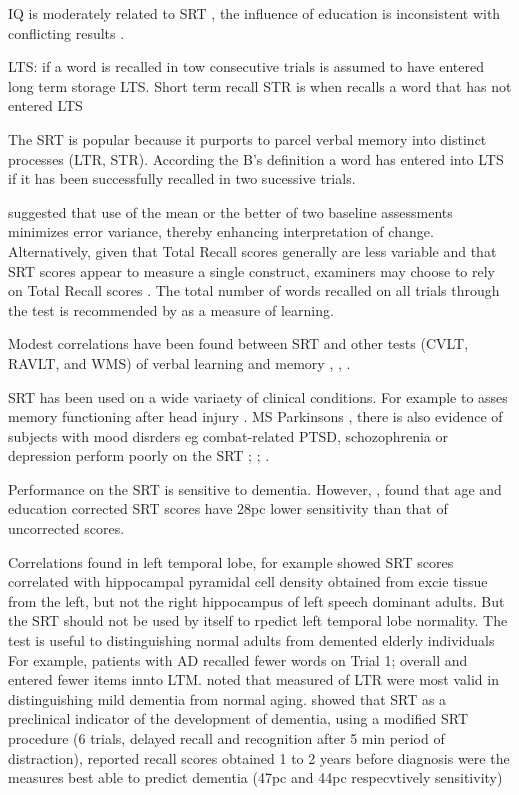 \documentclass[11pt]{article}
\begin{document}
IQ is moderately related to SRT \cite{sherman1995construct}, the influence of education is inconsistent with conflicting results \cite{campo2004normative}.

LTS: if a word is recalled in tow consecutive trials is assumed to have entered long term storage LTS. Short term recall STR is when recalls a word that has not entered LTS 

The SRT is popular because it purports to parcel verbal memory into distinct processes (LTR, STR). According the B's definition a word has entered into LTS if it has been successfully recalled in two sucessive trials.

\cite{westerveld1994assessment} suggested that use of the mean or the better of two baseline assessments minimizes error variance, thereby enhancing interpretation of change. Alternatively, given that Total Recall scores generally are less variable and
that SRT scores appear to measure a single construct, examiners may choose to rely on Total Recall scores \cite{westerveld1994assessment}.
The total number of words recalled on all trials through the test is recommended by as a measure of learning. 

Modest correlations have been found between SRT and other tests (CVLT, RAVLT, and WMS) of verbal learning and memory \cite{macartney1988intercorrelation}, \cite{schear1989examination}, \cite{westerveld1994assessment}.

SRT has been used on a wide variaety of clinical conditions. For example to asses memory functioning after head injury \cite{paniak1989recovery}. MS \cite{beatty1996memory} Parkinsons \cite{kuzis1999explicit}, there is also evidence of subjects with mood disrders eg combat-related PTSD, schozophrenia or depression perform poorly on the SRT \cite{bremner1993deficits}; \cite{ruchinskas2000neuropsychological}; \cite{sabe1995dissociation}.

Performance on the SRT is sensitive to dementia. However, \cite{sliwinski1997effect}, \cite{sliwinski2003optimizing} found that age and education corrected SRT scores have 28pc lower sensitivity than that of uncorrected scores. 

Correlations found in left temporal lobe, for example \cite{sass1990verbal} showed SRT scores correlated with hippocampal pyramidal cell density obtained from excie tissue from the left, but not the right hippocampus of left speech dominant adults. But the SRT should not be used by itself to rpedict left temporal lobe normality. 
The test is useful to distinguishing normal adults from demented elderly individuals \cite{campo2003discrimination} \cite{kuzis1999explicit} \cite{larrabee1985sensitivity} For example, patients with AD recalled fewer words on Trial 1; overall and entered fewer items innto LTM. \cite{masur1989distinguishing} noted that measured of LTR were most valid in distinguishing mild dementia from normal aging.
\cite{masur1990predicting} showed that SRT as a preclinical indicator of the development of dementia, using a modified SRT procedure (6 trials, delayed recall and recognition after 5 min period of distraction), reported recall scores obtained 1 to 2 years before diagnosis were the measures best able to predict dementia  (47pc and 44pc respecvtively sensitivity)
\end{document}
